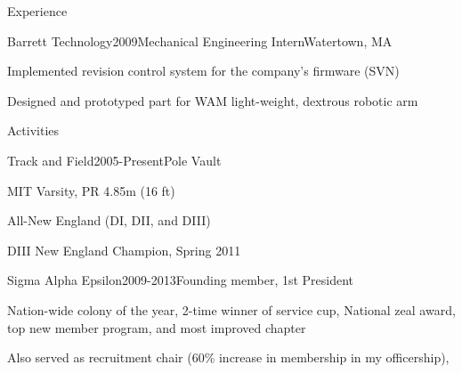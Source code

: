 \documentclass{resume}
\begin{document}
\begin{rSection}{Experience}

\begin{rSubsection}{Barrett Technology}{2009}{Mechanical Engineering Intern}{Watertown, MA}
\item Implemented revision control system for the company's firmware (SVN)
\item Designed and prototyped part for WAM light-weight, dextrous robotic arm
\end{rSubsection}


\end{rSection}

\begin{rSection}{Activities}
\begin{rSubsection}{Track and Field}{2005-Present}{Pole Vault}{}
\item MIT Varsity, PR 4.85m (16 ft)
\item All-New England (DI, DII, and DIII)
\item DIII New England Champion, Spring 2011
\end{rSubsection}

\begin{rSubsection}{Sigma Alpha Epsilon}{2009-2013}{Founding member, 1st President}{}
\item Nation-­wide colony of the year, 2-­time winner of service cup, National zeal award, top new member program, and most improved chapter
\item Also served as recruitment chair (60\% increase in membership in my officership), 

\end{rSubsection}
\end{rSection}
\end{document}
